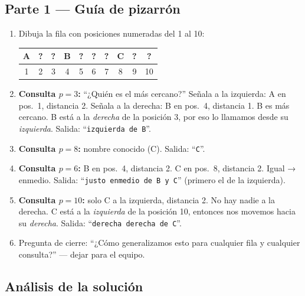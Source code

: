 \documentclass[12pt, oneside]{article}
\begin{document}
\subsection{Parte 1 — Guía de pizarrón}

\begin{notaprofesor}
  \begin{enumerate}
    \item Dibuja la fila con posiciones numeradas del 1 al 10:
    \begin{center}
      \ttfamily
      \begin{tabular}{|c|c|c|c|c|c|c|c|c|c|}
        \hline
        A & ? & ? & B & ? & ? & ? & C & ? & ? \\
        \hline
        1 & 2 & 3 & 4 & 5 & 6 & 7 & 8 & 9 & 10 \\
        \hline
      \end{tabular}
    \end{center}
    \item \textbf{Consulta $p = 3$:} ``¿Quién es el más cercano?''
          Señala a la izquierda: A en pos.\ 1, distancia 2.
          Señala a la derecha: B en pos.\ 4, distancia 1.
          B es más cercano.  B está a la \textit{derecha} de la posición 3,
          por eso lo llamamos desde su \textit{izquierda}.
          Salida: ``\texttt{izquierda de B}''.
    \item \textbf{Consulta $p = 8$:} nombre conocido (C).
          Salida: ``\texttt{C}''.
    \item \textbf{Consulta $p = 6$:} B en pos.\ 4, distancia 2.
          C en pos.\ 8, distancia 2.  Igual → enmedio.
          Salida: ``\texttt{justo enmedio de B y C}''
          (primero el de la izquierda).
    \item \textbf{Consulta $p = 10$:} solo C a la izquierda,
          distancia 2.  No hay nadie a la derecha.
          C está a la \textit{izquierda} de la posición 10,
          entonces nos movemos hacia su \textit{derecha}.
          Salida: ``\texttt{derecha derecha de C}''.
    \item Pregunta de cierre: ``¿Cómo generalizamos esto para cualquier
          fila y cualquier consulta?'' — dejar para el equipo.
  \end{enumerate}
\end{notaprofesor}

\subsection{Análisis de la solución}
\end{document}
